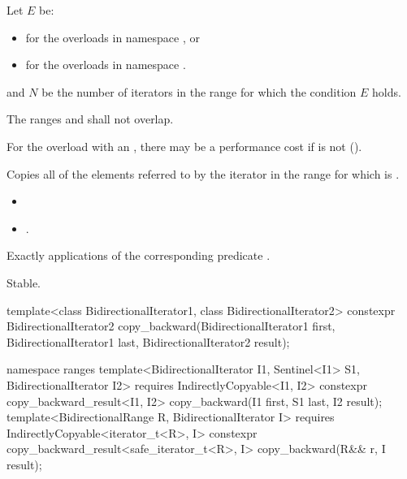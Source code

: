 \begin{itemdescr}
\pnum
\begin{addedblock}
Let $E$ be:
\begin{itemize}
\item {} for the overloads in namespace , or
\item {} for the overloads in
  namespace .
\end{itemize}
and $N$ be the number of iterators  in the range 
for which the condition $E$ holds.
\end{addedblock}

\pnum
\requires The ranges
and
shall not overlap.
\begin{note}
For the overload with an , there may be a performance
cost if  is not
 ().
\end{note}

\pnum
\effects Copies all of the elements referred to by the iterator 
in the range  for which  is
.

\pnum
\returns {}
\begin{itemize}
\item {}
\item {}.
\end{itemize}

\pnum
\complexity
Exactly  applications of the corresponding predicate
.

\pnum
\remarks Stable.
\end{itemdescr}

%
\begin{itemdecl}
template<class BidirectionalIterator1, class BidirectionalIterator2>
  constexpr BidirectionalIterator2
    copy_backward(BidirectionalIterator1 first,
                  BidirectionalIterator1 last,
                  BidirectionalIterator2 result);
\end{itemdecl}\begin{addedblock}\begin{itemdecl}
namespace ranges {
  template<BidirectionalIterator I1, Sentinel<I1> S1, BidirectionalIterator I2>
    requires IndirectlyCopyable<I1, I2>
    constexpr copy_backward_result<I1, I2>
      copy_backward(I1 first, S1 last, I2 result);
  template<BidirectionalRange R, BidirectionalIterator I>
    requires IndirectlyCopyable<iterator_t<R>, I>
    constexpr copy_backward_result<safe_iterator_t<R>, I>
      copy_backward(R&& r, I result);
}
\end{itemdecl}\end{addedblock}

